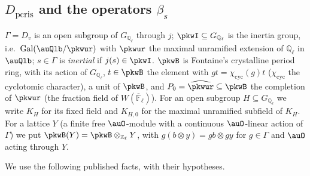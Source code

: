 \documentclass[10pt]{amsart}
\theoremstyle{definition}
\theoremstyle{remark}
\newcommand{\Z}{\mathbb Z}
\newcommand{\Q}{\mathbb Q}
\begin{document}
\subsection{$D_{\mathrm{pcris}}$ and the operators $\beta_s$}\label{pkw:ss-pcris}

$\Gamma=D_v$ is an open subgroup of $G_{\Q_\ell}$ through $j$; $\pkwI\subseteq G_{\Q_\ell}$ is the inertia
group, i.e.\ $\operatorname{Gal}(\auQlb/\pkwur)$ with $\pkwur$ the maximal unramified extension of
$\Q_\ell$ in $\auQlb$; $s\in\Gamma$ is \emph{inertial} if $j(s)\in\pkwI$. $\pkwB$ is Fontaine's
crystalline period ring, with its action of $G_{\Q_\ell}$, $t\in\pkwB$ the element with $gt=
\chi_{\mathrm{cyc}}(g)t$ ($\chi_{\mathrm{cyc}}$ the cyclotomic character), a unit of $\pkwB$, and
$P_0=\widehat{\pkwur}\subseteq\pkwB$ the completion of $\pkwur$ (the fraction field of
$W(\overline{\mathbb F}_\ell)$). For an open subgroup $H\subseteq G_{\Q_\ell}$ we write $K_H$ for its fixed
field and $K_{H,0}$ for the maximal unramified subfield of $K_H$. For a lattice $Y$ (a finite free
$\auO$-module with a continuous $\auO$-linear action of $\Gamma$) we put $\pkwB(Y)=\pkwB\otimes_{\Z_\ell}Y$,
with $g(b\otimes y)=gb\otimes gy$ for $g\in\Gamma$ and $\auO$ acting through $Y$.

We use the following published facts, with their hypotheses.
\end{document}
